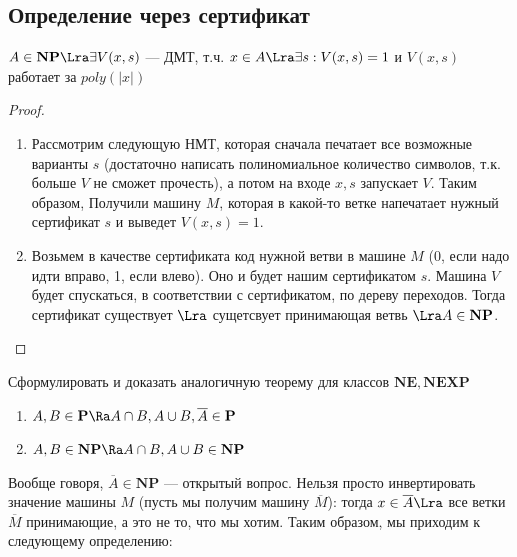 \subsection{Определение через сертификат}

\begin{theorem}
    \(A \in \mathbf{NP} \Lra \exists V(x, s)\) --- ДМТ, т.ч. \(x \in A \Lra \exists s: V(x, s) = 1\) и \(V(x, s)\) работает за \(poly(|x|)\)
\end{theorem}
\begin{proof}\indent
    \begin{enumerate}
        \item [\(\La\)] Рассмотрим следующую НМТ, которая сначала печатает все возможные варианты \(s\) (достаточно написать полиномиальное количество символов, т.к. больше \(V\) не сможет прочесть), а потом на входе \(x, s\) запускает \(V\). Таким образом, Получили машину \(M\), которая в какой-то ветке напечатает нужный сертификат \(s\) и выведет \(V(x, s) = 1\).
        \item [\(\Ra\)] Возьмем в качестве сертификата код нужной ветви в машине \(M\) (0, если надо идти вправо, 1, если влево). Оно и будет нашим сертификатом \(s\). Машина \(V\) будет спускаться, в соответствии с сертификатом, по дереву переходов. Тогда сертификат существует \(\Lra\) сущетсвует принимающая ветвь \(\Lra A \in \mathbf{NP}\).
    \end{enumerate}
\end{proof}

\begin{exercise}
    Сформулировать и доказать аналогичную теорему для классов \(\mathbf{NE}, \mathbf{NEXP}\)
\end{exercise}

\begin{proposition}
    \begin{enumerate}
        \item \(A, B \in \mathbf{P} \Ra A \cap B, A \cup B, \overline{A} \in \mathbf{P}\)
        \item \(A, B \in \mathbf{NP} \Ra A \cap B, A \cup B \in \mathbf{NP}\)
    \end{enumerate}
\end{proposition}

\begin{note}
    Вообще говоря, \(\overline{A} \in \mathbf{NP}\) --- открытый вопрос. Нельзя просто инвертировать значение машины \(M\) (пусть мы получим машину \(\overline{M}\)): тогда \(x \in \overline{A} \Lra\) все ветки \(\overline{M}\) принимающие, а это не то, что мы хотим. Таким образом, мы приходим к следующему определению:
\end{note}

